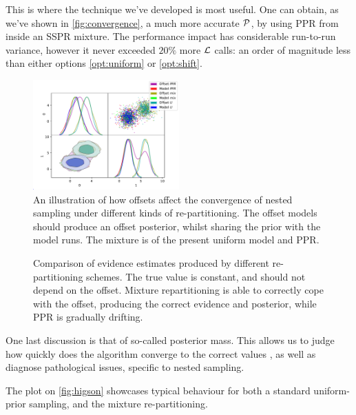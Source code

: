 \documentclass[usenatbib]{mnras}
\begin{document}
This is where the technique we've developed is most useful. One can
obtain, as we've shown in \autoref{fig:convergence}, a much more
accurate \({\cal P}\), by using PPR from inside an SSPR mixture. The
performance impact has considerable run-to-run variance, however it
never exceeded \(20\%\) more \({\cal L}\) calls: an order of magnitude
less than either options \ref{opt:uniform} or \ref{opt:shift}. 

\begin{figure}
\includegraphics[width=0.5\textwidth]{./illustrations/convergence.pdf}
\caption{An illustration of how offsets affect the convergence of nested sampling under different kinds of re-partitioning. The offset models should produce an offset posterior, whilst sharing the prior with the model runs. The mixture is of the present uniform model and PPR. \label{fig:convergence}}
\end{figure}

\begin{figure}
  
\caption{Comparison of evidence estimates produced by different re-partitioning schemes. The true value is constant, and should not depend on the offset. Mixture repartitioning is able to correctly cope with the offset, producing the correct evidence and posterior, while PPR is gradually drifting. \label{fig:drift}}
\end{figure}


One last discussion is that of so-called posterior mass. This allows
us to judge how quickly does the algorithm converge to the correct
values \cite{higson2018nestcheck}, as well as diagnose pathological
issues, specific to nested sampling. 

The plot on \autoref{fig:higson} showcases typical behaviour for
both a standard uniform-prior sampling, and the mixture
re-partitioning. 
\end{document}
